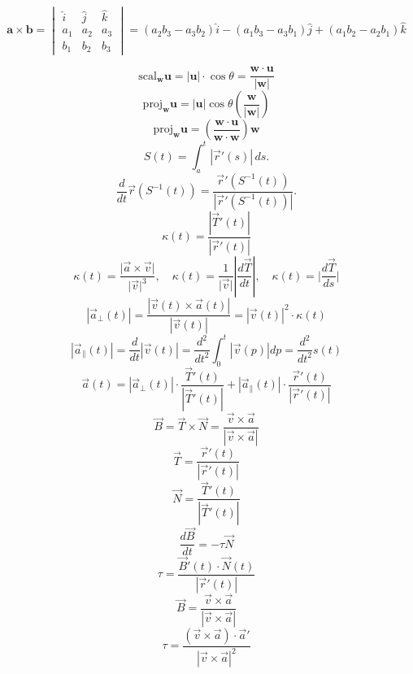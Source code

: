 \documentclass{report}
\begin{document}
\[
	\mathbf{a} \times \mathbf{b} = \begin{vmatrix}
		\hat{i} & \hat{j} & \hat{k} \\
		a_1     & a_2     & a_3     \\
		b_1     & b_2     & b_3
	\end{vmatrix} = (a_2b_3 - a_3b_2)\hat{i} - (a_1b_3 - a_3b_1)\hat{j} + (a_1b_2 - a_2b_1)\hat{k}
\]
\begin{multicols}{2}
\begin{center}
\end{center}
\[
	\text{scal}_{\mathbf{w}}\mathbf{u} = |\mathbf{u}| \cdot \cos\theta = \frac{\mathbf{w} \cdot \mathbf{u}}{|\mathbf{w}|}
\]
\[
	\text{proj}_{\mathbf{w}} \mathbf{u} = |\mathbf{u}| \cos \theta \left( \frac{\mathbf{w}}{|\mathbf{w}|} \right)
\]
\[
	\text{proj}_{\mathbf{w}} \mathbf{u} = \left( \frac{\mathbf{w} \cdot \mathbf{u}}{\mathbf{w} \cdot \mathbf{w}} \right) \mathbf{w}
\]
\[
	S(t) = \int_a^t \left| \vec{r}'(s) \right| \, ds.
\]
\[
	\frac{d}{dt} \vec{r}(S^{-1}(t)) = \frac{\vec{r}'(S^{-1}(t))}{\left| \vec{r}'(S^{-1}(t)) \right|}.
\]
\[
	\kappa(t) = \frac{|\vec{T}'(t)|}{|\vec{r}'(t)|}
\]
\[
	\kappa (t) = \frac{\lvert \vec{a} \times \vec{v} \rvert}{\lvert \vec{v} \rvert^3}, \quad \kappa (t) = \frac{1}{\lvert \vec{v} \rvert} \left\lvert \frac{d\vec{T}}{dt} \right\rvert, \quad \kappa (t) = \lvert \frac{d\vec{T}}{ds} \rvert
\]
\[
	|\vec{a}_\perp(t)| = \frac{|\vec{v}(t) \times \vec{a}(t)|}{|\vec{v}(t)|} = |\vec{v}(t)|^2 \cdot \kappa(t)
\]
\[
	|\vec{a}_\parallel(t)| = \frac{d}{dt}|\vec{v}(t)| = \frac{d^2}{dt^2} \int_0^t |\vec{v}(p)| dp = \frac{d^2}{dt^2} s(t)
\]
\[
	\vec{a}(t) = |\vec{a}_\perp(t)| \cdot \frac{\vec{T}'(t)}{|\vec{T	}'(t)|} + |\vec{a}_\parallel(t)| \cdot \frac{\vec{r}'(t)}{|\vec{r}'(t)|}
\]
\[
	\vec{B} = \vec{T} \times \vec{N} = \frac{\vec{v} \times \vec{a}}{|\vec{v} \times \vec{a}|}
\]
\[
	\vec{T} = \frac{\vec{r}'(t)}{|\vec{r}'(t)|}
\]
\[
	\vec{N} = \frac{\vec{T}'(t)}{|\vec{T}'(t)|}
\]
\[
	\frac{d\vec{B}}{dt} = -\tau \vec{N}
\]
\[
	\tau = \frac{\vec{B}'(t) \cdot \vec{N}(t)}{|\vec{r}'(t)|}
\]
\[
	\vec{B} = \frac{\vec{v} \times \vec{a}}{|\vec{v} \times \vec{a}|}
\]
\[
	\tau = \frac{(\vec{v} \times \vec{a}) \cdot \vec{a}'}{|\vec{v} \times \vec{a}|^2}
\]
\end{multicols}
\end{document}
